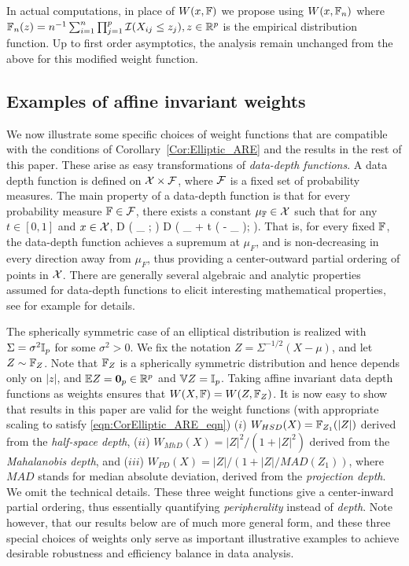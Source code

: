 In actual computations, in place of $W (x, {\mathbb{F}})$ we propose using $W (x, {\mathbb{F}}_{n})$ where
$ {\mathbb{F}}_{n}(z) = n^{-1} \sum_{i = 1}^{n} \prod_{j=1}^{p}
\mathcal{I} (X_{ij} \leq z_j ), z \in {\mathbb{R}}^p
$ is the empirical distribution function. Up to first order asymptotics, the analysis remain unchanged from the above for this modified weight function.

\subsection{Examples of affine invariant weights}

We now illustrate some specific choices of weight functions that are compatible with the 
conditions of Corollary~\ref{Cor:Elliptic_ARE} and the results in the rest of this paper.
 These arise as easy transformations 
of \textit{data-depth functions}. A data depth function 
is defined on $\mathcal{X} \times \mathcal{F}$, where $\mathcal{F}$ is  a fixed set of probability measures.
The main property of a data-depth function is that for every probability measure 
${\mathbb{F}} \in \mathcal{F}$, there exists a constant 
$\mu_{{\mathbb{F}}} \in  \mathcal{X}$ such that for any $t \in [ 0, 1]$ and $x \in \mathcal{X}$,
\baq 
D ( \mu_{\BF} ; \BF ) \geq D ( \mu_{\BF} + t ( \bfx - \mu_{\BF} ); \BF ). 
\label{eq:Peripherality}
\eaq
That is, for every fixed ${\mathbb{F}}$, the data-depth function achieves a supremum at 
$\mu_{F}$, and is non-decreasing in every direction away from $\mu_{F}$, thus providing 
a  center-outward partial ordering of points in $\mathcal{X}$. There are generally several 
algebraic and analytic properties assumed for data-depth functions to elicit interesting 
mathematical properties, see for example \cite{ref:DIMACS061_Serfling, ref:AoS00461_ZuoSerfling} for details. 


The spherically symmetric case of an elliptical distribution is realized with $\Sigma = \sigma^{2} {\mathbb{I}}_{p}$ for some $\sigma^{2} > 0$. We fix the notation $Z = \Sigma^{-1/2} (X - \mu)$, and let 
$Z \sim {\mathbb{F}}_{Z}$. Note that ${\mathbb{F}}_{Z}$ is a spherically symmetric distribution and hence
depends only on $|z|$, and ${\mathbb{E}} Z = \mathbf{0}_{p} \in {\mathbb{R}}^{p}$ and ${\mathbb{V}} Z = {\mathbb{I}}_{p}$. Taking affine invariant data depth functions as weights ensures that $W(X, {\mathbb{F}}) = W(Z, {\mathbb{F}}_Z)$. It is now easy to show that results in this paper are valid for the weight functions (with appropriate scaling to satisfy \eqref{eqn:CorElliptic_ARE_eqn})
($i$) $W_{HSD} (X) = {\mathbb{F}}_{Z_1} (| Z |)$ derived from the \textit{half-space depth},  
($ii$) $W_{MhD} (X) = |Z|^{2}/(1 + | Z |^2)$ derived from the \textit{Mahalanobis depth}, 
and ($iii$) $W_{PD} (X) = |Z|/(1+ | Z |/MAD(Z_1))$, where $MAD$ stands for median 
absolute deviation, derived from the \textit{projection depth}. We omit the technical 
details. These three weight functions give a center-inward partial ordering, thus essentially 
quantifying \textit{peripherality} instead of \textit{depth}.
Note however, that our results below are of much more general form, and 
these three special choices of weights only serve as important illustrative examples 
to achieve desirable robustness and efficiency balance in data analysis.


